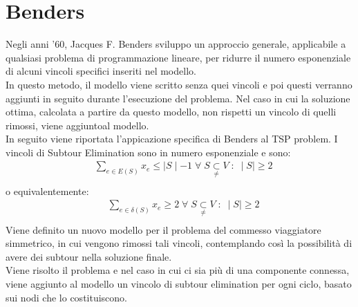 \section{Benders}
Negli anni '60, Jacques F. Benders sviluppo un approccio generale, applicabile a qualsiasi problema di programmazione lineare, per ridurre il numero esponenziale di alcuni vincoli specifici inseriti nel modello.\\
In questo metodo, il modello viene scritto senza quei vincoli e poi questi verranno aggiunti in seguito durante l'esecuzione del problema. Nel caso in cui la soluzione ottima, calcolata a partire da questo modello, non rispetti un vincolo di quelli rimossi, viene aggiuntoal modello. \\
In seguito viene riportata l'appicazione specifica di Benders al TSP problem.
I vincoli di Subtour Elimination sono in numero esponenziale e sono:\\
\begin{align}
&\underset{e\in E(S)}\sum{x_{e}} \leq \mid S\mid - 1\;\forall\;S\underset{\neq}{\subset}V\; : \; \mid S\mid\geq 2\\
\end{align}
o equivalentemente:
\begin{align}
&\underset{e\in \delta(S)}\sum{x_{e}}\geq 2\;\forall\;S\underset{\neq}{\subset}V\; : \; \mid S\mid\geq 2\\
\end{align}
Viene definito un nuovo modello per il problema del commesso viaggiatore simmetrico, in cui vengono rimossi tali vincoli, contemplando così la possibilità di avere dei subtour nella soluzione finale.\\
Viene risolto il problema e nel caso in cui ci sia più di una componente connessa, viene aggiunto al modello un vincolo di subtour elimination per ogni ciclo, basato sui nodi che lo costituiscono.\\

